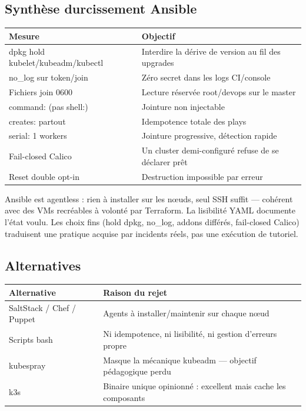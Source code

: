 \documentclass[12pt,a4paper]{article}
\begin{document}
\subsection{Synthèse durcissement Ansible}
\begin{longtable}{@{}p{5.4cm}p{8.8cm}@{}}
\toprule
\textbf{Mesure} & \textbf{Objectif} \\
\midrule
\endhead
dpkg hold kubelet/kubeadm/kubectl & Interdire la dérive de version au fil des upgrades \\
no\_log sur token/join & Zéro secret dans les logs CI/console \\
Fichiers join 0600 & Lecture réservée root/devops sur le master \\
command: (pas shell:) & Jointure non injectable \\
creates: partout & Idempotence totale des plays \\
serial: 1 workers & Jointure progressive, détection rapide \\
Fail-closed Calico & Un cluster demi-configuré refuse de se déclarer prêt \\
Reset double opt-in & Destruction impossible par erreur \\
\bottomrule
\end{longtable}

\begin{whybox}
Ansible est agentless : rien à installer sur les nœuds, seul SSH suffit --- cohérent avec des VMs recréables à volonté par Terraform. La lisibilité YAML documente l'état voulu. Les choix fins (hold dpkg, no\_log, addons différés, fail-closed Calico) traduisent une pratique acquise par incidents réels, pas une exécution de tutoriel.
\end{whybox}

\subsection{Alternatives}
\begin{tabular}{@{}lp{10.5cm}@{}}
\toprule
\textbf{Alternative} & \textbf{Raison du rejet} \\
\midrule
SaltStack / Chef / Puppet & Agents à installer/maintenir sur chaque nœud \\
Scripts bash & Ni idempotence, ni lisibilité, ni gestion d'erreurs propre \\
kubespray & Masque la mécanique kubeadm --- objectif pédagogique perdu \\
k3s & Binaire unique opinionné : excellent mais cache les composants \\
\bottomrule
\end{tabular}
\end{document}
